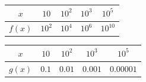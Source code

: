 \documentclass[12pt,a4paper]{article}
\begin{document}
\begin{center}
\begin{minipage}{0.45\textwidth}
    \centering
    \renewcommand{\arraystretch}{1.3}
    \begin{tabular}{|c|c|c|c|c|}
        \hline
        $x$ & $10$ & $10^2$ & $10^3$ & $10^5$ \\
        \hline
        $f(x)$ & $10^2$ & $10^4$ & $10^6$ & $10^{10}$ \\
        \hline
    \end{tabular}
\end{minipage}
\hfill
\begin{minipage}{0.45\textwidth}
    \centering
    \renewcommand{\arraystretch}{1.3}
    \begin{tabular}{|c|c|c|c|c|}
        \hline
        $x$ & $10$ & $10^2$ & $10^3$ & $10^5$ \\
        \hline
        $g(x)$ & $0.1$ & $0.01$ & $0.001$ & $0.00001$ \\
        \hline
    \end{tabular}
\end{minipage}
\end{center}

\vspace{1cm}
\end{document}
